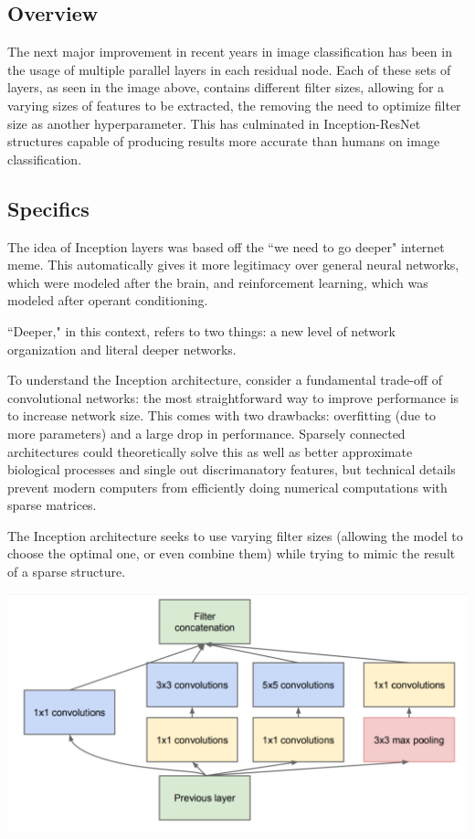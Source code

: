 \documentclass{article}
\begin{document}
\subsection{Overview}
The next major improvement in recent years in image classification has been in the usage of multiple parallel layers in each residual node. Each of these sets of layers, as seen in the image above, contains different filter sizes, allowing for a varying sizes of features to be extracted, the removing the need to optimize filter size as another hyperparameter. This has culminated in Inception-ResNet structures capable of producing results more accurate than humans on image classification.

\subsection{Specifics}
    The idea of Inception layers was based off the ``we need to go deeper" internet meme. This automatically gives it more legitimacy over general neural networks, which were modeled after the brain, and reinforcement learning, which was modeled after operant conditioning.
    
    ``Deeper," in this context, refers to two things: a new level of network organization and literal deeper networks. 
    
    To understand the Inception architecture, consider a fundamental trade-off of convolutional networks: the most straightforward way to improve performance is to increase network size. This comes with two drawbacks: overfitting (due to more parameters) and a large drop in performance. Sparsely connected architectures could theoretically solve this as well as better approximate biological processes and single out discrimanatory features, but technical details prevent modern computers from efficiently doing numerical computations with sparse matrices.
    
    The Inception architecture seeks to use varying filter sizes (allowing the model to choose the optimal one, or even combine them) while trying to mimic the result of a sparse structure. 
    
    \begin{center}
    \includegraphics[scale=0.5]{inception2}
    \end{center}
    
\end{document}
